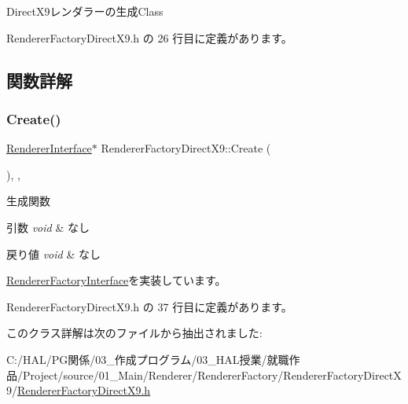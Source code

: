 Direct\+X9レンダラーの生成\+Class 

 Renderer\+Factory\+Direct\+X9.\+h の 26 行目に定義があります。



\subsection{関数詳解}
\mbox{\label{class_renderer_factory_direct_x9_aa64ac54f3efe121f531a28dd3b7690e3}} 
\subsubsection{\texorpdfstring{Create()}{Create()}}
{\footnotesize\ttfamily \mbox{\hyperlink{class_renderer_interface}{Renderer\+Interface}}$\ast$ Renderer\+Factory\+Direct\+X9\+::\+Create (\begin{DoxyParamCaption}{ }\end{DoxyParamCaption})\hspace{0.3cm}{\ttfamily [inline]}, {\ttfamily [override]}, {\ttfamily [virtual]}}



生成関数 


\begin{DoxyParams}{引数}
{\em void} & なし \\
\hline
\end{DoxyParams}

\begin{DoxyRetVals}{戻り値}
{\em void} & なし \\
\hline
\end{DoxyRetVals}


\mbox{\hyperlink{class_renderer_factory_interface_aa81911973b6079fda8489409385d71e3}{Renderer\+Factory\+Interface}}を実装しています。



 Renderer\+Factory\+Direct\+X9.\+h の 37 行目に定義があります。



このクラス詳解は次のファイルから抽出されました\+:\begin{DoxyCompactItemize}
\item 
C\+:/\+H\+A\+L/\+P\+G関係/03\+\_\+作成プログラム/03\+\_\+\+H\+A\+L授業/就職作品/\+Project/source/01\+\_\+\+Main/\+Renderer/\+Renderer\+Factory/\+Renderer\+Factory\+Direct\+X9/\mbox{\hyperlink{_renderer_factory_direct_x9_8h}{Renderer\+Factory\+Direct\+X9.\+h}}\end{DoxyCompactItemize}
